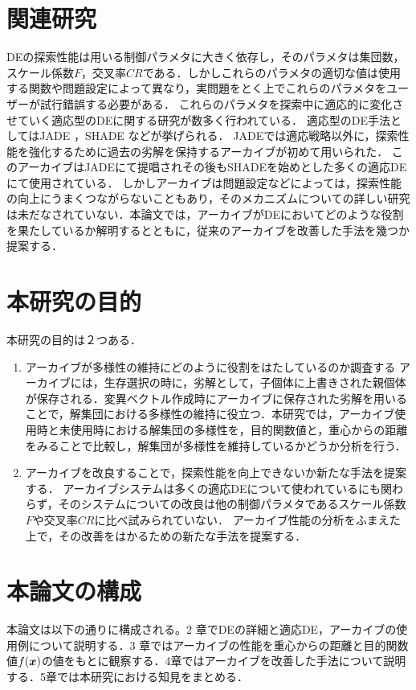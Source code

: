 \documentclass[a4paper,11pt,oneside,openany]{jsbook}
\def\vector#1{\mbox{\boldmath $#1$}}
\begin{document}
\section{関連研究}
DEの探索性能は用いる制御パラメタに大きく依存し，そのパラメタは集団数，スケール係数$F$，交叉率$CR$である．しかしこれらのパラメタの適切な値は使用する関数や問題設定によって異なり，実問題をとく上でこれらのパラメタをユーザーが試行錯誤する必要がある．
これらのパラメタを探索中に適応的に変化させていく適応型のDEに関する研究が数多く行われている．
適応型のDE手法としてはJADE \cite{JADE} ，SHADE \cite{SHADE} などが挙げられる．
JADEでは適応戦略以外に，探索性能を強化するために過去の劣解を保持するアーカイブが初めて用いられた．
このアーカイブはJADEにて提唱されその後もSHADEを始めとした多くの適応DEにて使用されている．
しかしアーカイブは問題設定などによっては，探索性能の向上にうまくつながらないこともあり，そのメカニズムについての詳しい研究は未だなされていない．本論文では，アーカイブがDEにおいてどのような役割を果たしているか解明するとともに，従来のアーカイブを改善した手法を幾つか提案する．

\section{本研究の目的}
本研究の目的は２つある．
\begin{enumerate}
\item アーカイブが多様性の維持にどのように役割をはたしているのか調査する
\vspace{3mm}
\newline
アーカイブには，生存選択の時に，劣解として，子個体に上書きされた親個体が保存される．変異ベクトル作成時にアーカイブに保存された劣解を用いることで，解集団における多様性の維持に役立つ．本研究では，アーカイブ使用時と未使用時における解集団の多様性を，目的関数値と，重心からの距離をみることで比較し，解集団が多様性を維持しているかどうか分析を行う．
\newline


\item アーカイブを改良することで，探索性能を向上できないか新たな手法を提案する．
\vspace{3mm}
\newline
アーカイブシステムは多くの適応DEについて使われているにも関わらず，そのシステムについての改良は他の制御パラメタであるスケール係数$F$や交叉率$CR$に比べ試みられていない．
アーカイブ性能の分析をふまえた上で，その改善をはかるための新たな手法を提案する．
\end{enumerate}


\section{本論文の構成}
本論文は以下の通りに構成される。2 章でDEの詳細と適応DE，アーカイブの使用例について説明する．3 章ではアーカイブの性能を重心からの距離と目的関数値$f(\vector{x})$の値をもとに観察する．4章ではアーカイブを改善した手法について説明する．5章では本研究における知見をまとめる．
\end{document}
